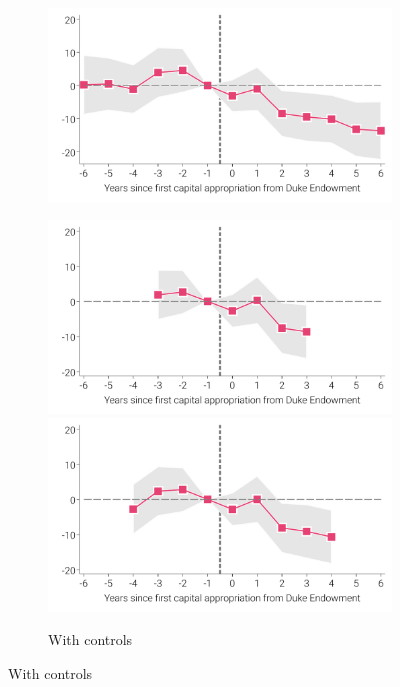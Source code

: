 \documentclass[12pt]{article}
\begin{document}
\begin{figure}[ht]
\begin{minipage}{\linewidth}
\begin{subfigure}[b]{0.49\columnwidth}
    \includegraphics[width=\linewidth]{../analysis/output/appendix/figure_d1a_event_study_pooled_imr_stacked_poisson_kappa_6_controls_no.pdf}
  \end{subfigure}
  \hfill %
  \begin{subfigure}[b]{0.49\columnwidth}
    \caption{\scriptsize{With controls}}
    \includegraphics[width=\linewidth]{../analysis/output/appendix/figure_d1b_event_study_pooled_imr_stacked_poisson_kappa_3_controls_yes.pdf}
    \includegraphics[width=\linewidth]{../analysis/output/appendix/figure_d1b_event_study_pooled_imr_stacked_poisson_kappa_4_controls_yes.pdf}

\end{subfigure}
\end{minipage}
\end{figure}
\end{document}
